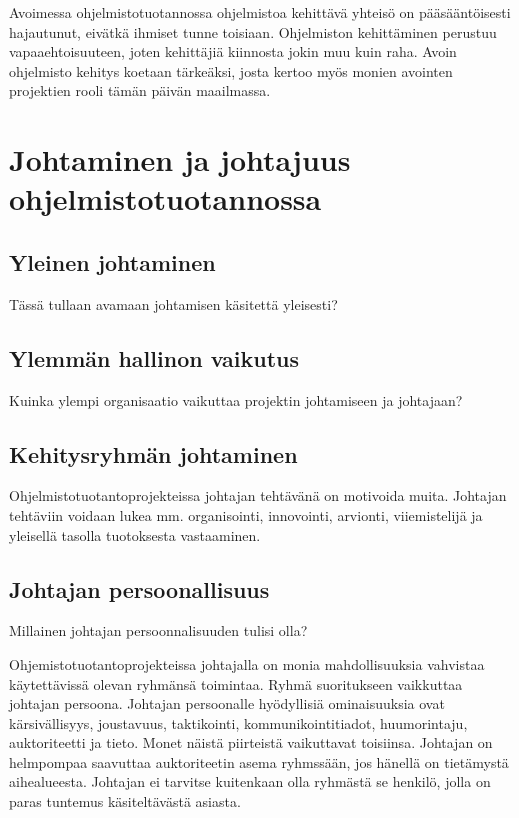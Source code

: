 \documentclass[finnish]{tktltiki2}
\theoremstyle{definition}
\theoremstyle{remark}
\begin{document}
Avoimessa ohjelmistotuotannossa ohjelmistoa kehittävä yhteisö on pääsääntöisesti hajautunut, eivätkä ihmiset tunne toisiaan. Ohjelmiston kehittäminen perustuu vapaaehtoisuuteen, joten kehittäjiä kiinnosta jokin muu kuin raha. Avoin ohjelmisto kehitys koetaan tärkeäksi, josta kertoo myös monien avointen projektien rooli tämän päivän maailmassa. ~\cite{Li:2006:MOS:1125170.1125182}

\section{Johtaminen ja johtajuus ohjelmistotuotannossa}


\subsection{Yleinen johtaminen}

Tässä tullaan avamaan johtamisen käsitettä yleisesti?

\subsection{Ylemmän hallinon vaikutus}

Kuinka ylempi organisaatio vaikuttaa projektin johtamiseen ja johtajaan?

\subsection{Kehitysryhmän johtaminen}

Ohjelmistotuotantoprojekteissa johtajan tehtävänä on motivoida muita. Johtajan tehtäviin voidaan lukea mm. organisointi, innovointi, arvionti, viiemistelijä  ja yleisellä tasolla tuotoksesta vastaaminen. ~\cite{4017705}

\subsection{Johtajan persoonallisuus}

Millainen johtajan persoonnalisuuden tulisi olla?

Ohjemistotuotantoprojekteissa johtajalla on monia mahdollisuuksia vahvistaa käytettävissä olevan ryhmänsä toimintaa. Ryhmä suoritukseen vaikkuttaa johtajan persoona. Johtajan persoonalle hyödyllisiä ominaisuuksia ovat kärsivällisyys, joustavuus, taktikointi, kommunikointitiadot, huumorintaju, auktoriteetti ja tieto. Monet näistä piirteistä vaikuttavat toisiinsa. Johtajan on helmpompaa saavuttaa auktoriteetin asema ryhmssään, jos hänellä on tietämystä aihealueesta. Johtajan ei tarvitse kuitenkaan olla ryhmästä se henkilö, jolla on paras tuntemus käsiteltävästä asiasta.~\cite{4017705} 
\end{document}
